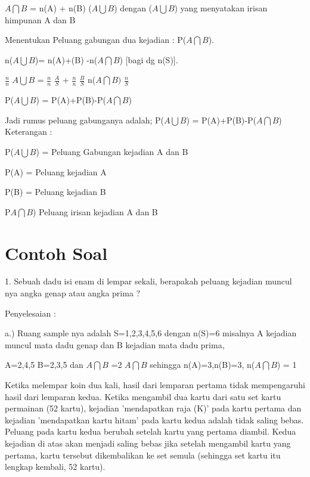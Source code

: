 \documentclass[11pt,fleqn]{book} %
\begin{document}
{$A\bigcap B$ = n(A) + n(B) ($A\bigcup B$) dengan  ($A\bigcup B$) yang menyatakan irisan himpunan A dan B

Menentukan Peluang gabungan dua kejadian : P($A\bigcap B$).

n($A\bigcup B$)= n(A)+(B) -n($A\bigcap B$) [bagi dg n(S)]. 

$\frac{n}{n}$ $A\bigcup B$ = $\frac{n}{n}$ $\frac{A}{S}$ + $\frac{n}{n}$ $\frac{B}{S}$ n($A\bigcap B)$ $\frac{n}S$

P($A\bigcup B$) = P(A)+P(B)-P($A\bigcap B$)

Jadi rumus peluang gabunganya adalah;
P($A\bigcup B$) = P(A)+P(B)-P($A\bigcap B$)
Keterangan :

P($A\bigcup B$) = Peluang Gabungan kejadian A dan B

P(A) = Peluang kejadian A

P(B) = Peluang kejadian B

P$A\bigcap B$) Peluang irisan kejadian A dan B



\section{Contoh Soal}

1. Sebuah dadu isi enam di lempar sekali, berapakah peluang kejadian muncul nya angka genap atau angka prima ? 

Penyelesaian :

a.) Ruang sample nya adalah S={1,2,3,4,5,6} dengan n(S)=6
misalnya A kejadian muncul mata dadu genap dan B kejadian mata dadu prima,

A={2,4,5} B={2,3,5} dan $A\bigcap B$ ={2}
$A\bigcap B$
sehingga n(A)=3,n(B)=3, n($A\bigcap B$) = 1

Ketika melempar koin dua kali, hasil dari lemparan pertama tidak mempengaruhi hasil dari lemparan kedua.
\vspace{1cm} 
Ketika mengambil dua kartu dari satu set kartu permainan (52 kartu), kejadian 'mendapatkan raja (K)' pada kartu pertama dan kejadian 'mendapatkan kartu hitam' pada kartu kedua adalah tidak saling bebas. Peluang pada kartu kedua berubah setelah kartu yang pertama diambil. Kedua kejadian di atas akan menjadi saling bebas jika setelah mengambil kartu yang pertama, kartu tersebut dikembalikan ke set semula (sehingga set kartu itu lengkap kembali, 52 kartu).
\vspace{1cm} 

}
\end{document}
